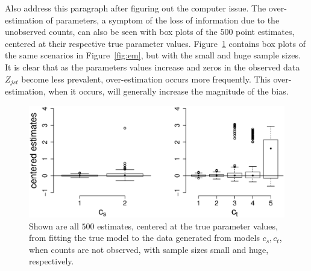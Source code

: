 {\color{red} Also address this paragraph after figuring out the computer issue.}  The over-estimation of parameters, a symptom of the loss of information due to the unobserved counts, can also be seen with box plots of the $500$ point estimates, centered at their respective true parameter values.  Figure~\ref{fig:em_bp} contains box plots of the same scenarios in Figure~\ref{fig:em}, but with the small and huge sample sizes.  It is clear that as the parameters values increase and zeros in the observed data $Z_{jst}$ become less prevalent, over-estimation occurs more frequently.  This over-estimation, when it occurs, will generally increase the magnitude of the bias.



\begin{figure}
  \centering
  \includegraphics[scale=0.5]{em_bp}
  \caption{Shown are all $500$ estimates, centered at the true parameter values, from fitting the true model to the data generated from models $c_s,c_t$, when counts are not observed, with sample sizes small and huge, respectively.}
  \label{fig:em_bp}
\end{figure}


